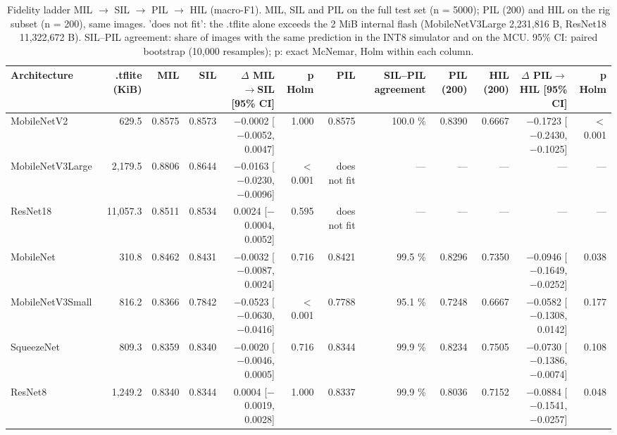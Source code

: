 
\begin{table}[htbp]
\centering
\scriptsize
\caption{Fidelity ladder MIL $\rightarrow$ SIL $\rightarrow$ PIL $\rightarrow$ HIL (macro-F1). MIL, SIL and PIL on the full test set (n = 5000); PIL (200) and HIL on the rig subset (n = 200), same images. 'does not fit': the .tflite alone exceeds the 2 MiB internal flash (MobileNetV3Large 2,231,816 B, ResNet18 11,322,672 B). SIL--PIL agreement: share of images with the same prediction in the INT8 simulator and on the MCU. 95\% CI: paired bootstrap (10,000 resamples); p: exact McNemar, Holm within each column.}
\label{tab:ladder-coco-1}
\begin{tabular}{lrrrrrrrrrrr}
\toprule
Architecture & .tflite (KiB) & MIL & SIL & $\Delta$ MIL$\rightarrow$SIL [95\% CI] & p Holm & PIL & SIL--PIL agreement & PIL (200) & HIL (200) & $\Delta$ PIL$\rightarrow$HIL [95\% CI] & p Holm \\
\midrule
MobileNetV2 & 629.5 & 0.8575 & 0.8573 & $-$0.0002 [$-$0.0052, 0.0047] & 1.000 & 0.8575 & 100.0 \% & 0.8390 & 0.6667 & $-$0.1723 [$-$0.2430, $-$0.1025] & $<$0.001 \\
MobileNetV3Large & 2,179.5 & 0.8806 & 0.8644 & $-$0.0163 [$-$0.0230, $-$0.0096] & $<$0.001 & does not fit & --- & --- & --- & --- & --- \\
ResNet18 & 11,057.3 & 0.8511 & 0.8534 & 0.0024 [$-$0.0004, 0.0052] & 0.595 & does not fit & --- & --- & --- & --- & --- \\
MobileNet & 310.8 & 0.8462 & 0.8431 & $-$0.0032 [$-$0.0087, 0.0024] & 0.716 & 0.8421 & 99.5 \% & 0.8296 & 0.7350 & $-$0.0946 [$-$0.1649, $-$0.0252] & 0.038 \\
MobileNetV3Small & 816.2 & 0.8366 & 0.7842 & $-$0.0523 [$-$0.0630, $-$0.0416] & $<$0.001 & 0.7788 & 95.1 \% & 0.7248 & 0.6667 & $-$0.0582 [$-$0.1308, 0.0142] & 0.177 \\
SqueezeNet & 809.3 & 0.8359 & 0.8340 & $-$0.0020 [$-$0.0046, 0.0005] & 0.716 & 0.8344 & 99.9 \% & 0.8234 & 0.7505 & $-$0.0730 [$-$0.1386, $-$0.0074] & 0.108 \\
ResNet8 & 1,249.2 & 0.8340 & 0.8344 & 0.0004 [$-$0.0019, 0.0028] & 1.000 & 0.8337 & 99.9 \% & 0.8036 & 0.7152 & $-$0.0884 [$-$0.1541, $-$0.0257] & 0.048 \\
\bottomrule
\end{tabular}
\end{table}

